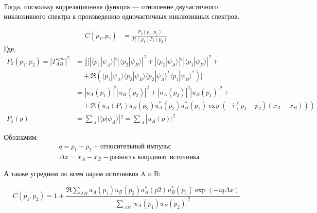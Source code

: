 \documentclass[a4paper]{extarticle}
\begin{document}
    Тогда, поскольку корреляционная функция --- 
    отношение двучастичного инклюзивного спектра 
    к произведению одночастичных инклюзивных спектров.

    \begin{align}
        C(p_1, p_2) &= 
            \frac{
                P_2(p_1, p_2)
            }{
                P_1(p_1)P_1(p_2)
            }
    \end{align}
    Где,
    \begin{align}
        P_2(p_1, p_2) = 
        |T^{sym}_{AB}|^2 &= 
        \frac{1}{2} 
        \bigg[
            |\langle p_{1} | \psi_{A} \rangle|^2 
            |\langle p_{2} | \psi_{B}\rangle|^2 + 
            |\langle p_{2} | \psi_{A} \rangle|^2 
            |\langle p_{1} | \psi_{B}\rangle|^2 + \nonumber \\
            & \quad + \mathfrak{R}
            \left(
                \langle p_{1} | \psi_{A}\rangle 
                \langle p_{2} | \psi_{B}\rangle 
                \langle p_{2} | \psi_{A}\rangle^{*} 
                \langle p_{1} | \psi_{B}\rangle^{*}
            \right)
        \bigg] \nonumber \\
        &= |u_{A}(p_1)|^2 |u_{B}(p_2)|^2 + 
        |u_{A}(p_2)|^2 |u_{B}(p_1)|^2 + \nonumber \\
        & \quad + 
        \mathfrak{R}(
            u_{A}(P_1)
            u_{B}(p_2)
            u^{*}_{A}(p_2)
            u^{*}_{B}(p_1) 
            \exp(-i(p_1 - p_2)(x_{A} - x_{B}))
        )\\
        P_1(p) &= 
            \sum_{A} | \langle p|\psi_{A}\rangle|^2 = 
            \sum_{A} |u_{A}(p)|^2 
    \end{align}

    Обозначим:
    \begin{align*}
        &q = p_{1} - p_{2} 
            - \text{относительный импульс} \\
        &\Delta x = x_{A} 
            - x_{B} - \text{разность координат источника}
    \end{align*}

    А также усредним по всем парам источников A и B:

    \begin{equation}
        C (p_1, p_2) = 1 + \frac{
            \mathfrak{R}
            \sum_{AB} 
                u_A(p_1)
                u_B(p_2)
                u^{*}_A(p2)
                u^{*}_B(p_1) 
                \exp(-iq\Delta x)
        }{
            \sum_{AB} 
                |u_A(p_1)u_B(p_2)|^2
        }
    \end{equation}
\end{document}
